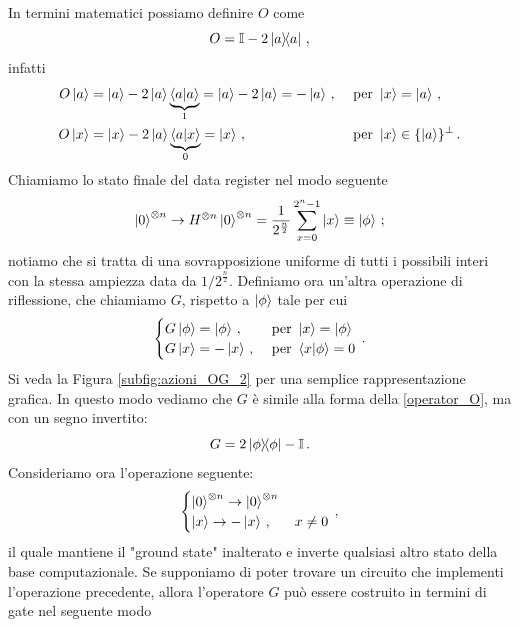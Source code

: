 In termini matematici possiamo definire $O$ come
\begin{equation}\label{operator_O}
    O=\mathbb{I}-2\op{a}{a} \, ,
\end{equation}
infatti
\begin{align*}
    O\ket a &= \ket a -2\ket{a}\underbrace{\ip{a}{a}}_{1}= \ket a - 2\ket{a} = -\ket{a} \, , &\text{ per } \ket{x} &= \ket{a} \, , \\
    O\ket x &= \ket x -2\ket{a}\underbrace{\ip{a}{x}}_{0}= \ket{x} \, , &\text{ per } \ket{x} &\in \{ \ket{a} \}^\perp \, .
\end{align*}
Chiamiamo lo stato finale del data register nel modo seguente 
\begin{equation}\label{sovrapposizione_phi}
    \ket{0}^{\otimes n}\rightarrow H^{\otimes n}\ket{0}^{\otimes n}=\frac{1}{2^{\frac n2}}\sum_{x=0}^{2^n-1} \ket{x} \equiv \ket\phi \, ;
\end{equation}
notiamo che si tratta di una sovrapposizione uniforme di tutti i possibili interi con la stessa ampiezza data da $1/2^{\frac{n}{2}}$. Definiamo ora un'altra operazione di riflessione, che chiamiamo $G$, rispetto a $\ket\phi$ tale per cui
\begin{equation*}
    \begin{cases}
        G\ket\phi=\ket\phi \, , &\text{ per }\ket{x} = \ket{\phi} \\
        G\ket x=-\ket x \, , &\text{ per } \ip{x}{\phi} = 0
    \end{cases} \, .
\end{equation*}
Si veda la Figura \ref{subfig:azioni_OG_2} per una semplice rappresentazione grafica. In questo modo vediamo che $G$ è simile alla forma della \eqref{operator_O}, ma con un segno invertito:
\begin{equation}\label{operator_G}
    G=2\op{\phi}{\phi}-\mathbb{I} \, .
\end{equation}
Consideriamo ora l'operazione seguente:
\begin{equation}\label{operatore_incognito}
    \begin{cases}
        \ket{0}^{\otimes n} \rightarrow \ket{0}^{\otimes n} \,  & \\
        \ket{x} \rightarrow -\ket{x} \, , & x  \neq 0
    \end{cases} \, ,
\end{equation}
il quale mantiene il "ground state" inalterato e inverte qualsiasi altro stato della base computazionale. Se supponiamo di poter trovare un circuito che implementi l'operazione precedente, allora l'operatore $G$ può essere costruito in termini di gate nel seguente modo
